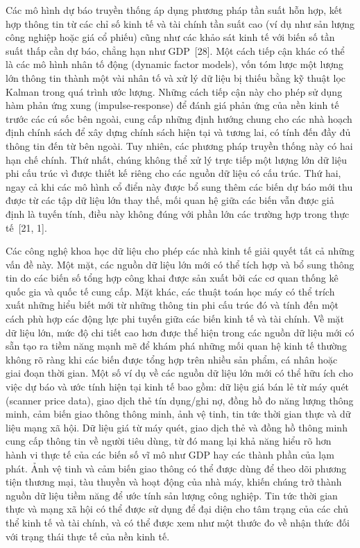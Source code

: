 Các mô hình dự báo truyền thống áp dụng phương pháp tần suất hỗn hợp, kết hợp thông tin từ các chỉ số kinh tế và tài chính tần suất cao (ví dụ như sản lượng công nghiệp hoặc giá cổ phiếu) cũng như các khảo sát kinh tế với biến số tần suất thấp cần dự báo, chẳng hạn như GDP~[28]. Một cách tiếp cận khác có thể là các mô hình nhân tố động (dynamic factor models), vốn tóm lược một lượng lớn thông tin thành một vài nhân tố và xử lý dữ liệu bị thiếu bằng kỹ thuật lọc Kalman trong quá trình ước lượng. Những cách tiếp cận này cho phép sử dụng hàm phản ứng xung (impulse-response) để đánh giá phản ứng của nền kinh tế trước các cú sốc bên ngoài, cung cấp những định hướng chung cho các nhà hoạch định chính sách để xây dựng chính sách hiện tại và tương lai, có tính đến đầy đủ thông tin đến từ bên ngoài. Tuy nhiên, các phương pháp truyền thống này có hai hạn chế chính. Thứ nhất, chúng không thể xử lý trực tiếp một lượng lớn dữ liệu phi cấu trúc vì được thiết kế riêng cho các nguồn dữ liệu có cấu trúc. Thứ hai, ngay cả khi các mô hình cổ điển này được bổ sung thêm các biến dự báo mới thu được từ các tập dữ liệu lớn thay thế, mối quan hệ giữa các biến vẫn được giả định là tuyến tính, điều này không đúng với phần lớn các trường hợp trong thực tế~[21, 1].

Các công nghệ khoa học dữ liệu cho phép các nhà kinh tế giải quyết tất cả những vấn đề này. Một mặt, các nguồn dữ liệu lớn mới có thể tích hợp và bổ sung thông tin do các biến số tổng hợp công khai được sản xuất bởi các cơ quan thống kê quốc gia và quốc tế cung cấp. Mặt khác, các thuật toán học máy có thể trích xuất những hiểu biết mới từ những thông tin phi cấu trúc đó và tính đến một cách phù hợp các động lực phi tuyến giữa các biến kinh tế và tài chính. Về mặt dữ liệu lớn, mức độ chi tiết cao hơn được thể hiện trong các nguồn dữ liệu mới có sẵn tạo ra tiềm năng mạnh mẽ để khám phá những mối quan hệ kinh tế thường không rõ ràng khi các biến được tổng hợp trên nhiều sản phẩm, cá nhân hoặc giai đoạn thời gian. Một số ví dụ về các nguồn dữ liệu lớn mới có thể hữu ích cho việc dự báo và ước tính hiện tại kinh tế bao gồm: dữ liệu giá bán lẻ từ máy quét (scanner price data), giao dịch thẻ tín dụng/ghi nợ, đồng hồ đo năng lượng thông minh, cảm biến giao thông thông minh, ảnh vệ tinh, tin tức thời gian thực và dữ liệu mạng xã hội. Dữ liệu giá từ máy quét, giao dịch thẻ và đồng hồ thông minh cung cấp thông tin về người tiêu dùng, từ đó mang lại khả năng hiểu rõ hơn hành vi thực tế của các biến số vĩ mô như GDP hay các thành phần của lạm phát. Ảnh vệ tinh và cảm biến giao thông có thể được dùng để theo dõi phương tiện thương mại, tàu thuyền và hoạt động của nhà máy, khiến chúng trở thành nguồn dữ liệu tiềm năng để ước tính sản lượng công nghiệp. Tin tức thời gian thực và mạng xã hội có thể được sử dụng để đại diện cho tâm trạng của các chủ thể kinh tế và tài chính, và có thể được xem như một thước đo về nhận thức đối với trạng thái thực tế của nền kinh tế.


